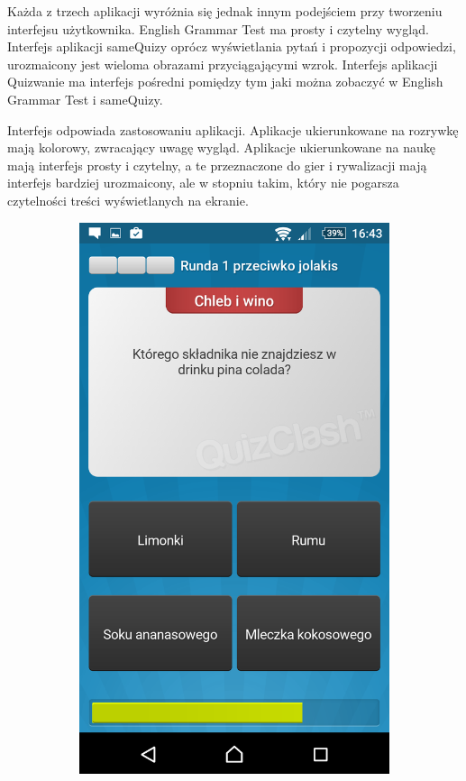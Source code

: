 \documentclass[archivemod, eng]{mgr}
\begin{document}
		Każda z trzech aplikacji wyróżnia się jednak innym podejściem przy tworzeniu interfejsu użytkownika. English Grammar Test ma prosty i czytelny wygląd. Interfejs aplikacji sameQuizy oprócz wyświetlania pytań i propozycji odpowiedzi, urozmaicony jest wieloma obrazami przyciągającymi wzrok. Interfejs aplikacji Quizwanie ma interfejs pośredni pomiędzy tym jaki można zobaczyć w English Grammar Test i sameQuizy.
		
		Interfejs odpowiada zastosowaniu aplikacji. Aplikacje ukierunkowane na rozrywkę mają kolorowy, zwracający uwagę wygląd. Aplikacje ukierunkowane na naukę mają interfejs prosty i czytelny, a te przeznaczone do gier i rywalizacji mają interfejs bardziej urozmaicony, ale w stopniu takim, który nie pogarsza czytelności treści wyświetlanych na ekranie.
		
		\begin{figure}[ht]
			\centering
			\begin{subfigure}{.32\textwidth}
				\centering
				\includegraphics[width=.9\linewidth]{Quizwanie.png}

\end{subfigure}
\end{figure}
\end{document}
